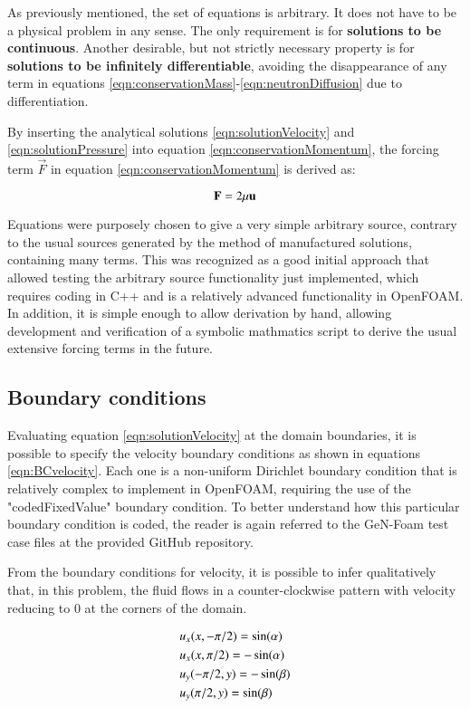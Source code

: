 As previously mentioned, the set of equations is arbitrary.
It does not have to be a physical problem in any sense.
The only requirement is for \textbf{solutions to be continuous}.
Another desirable, but not strictly necessary property is for \textbf{solutions to be infinitely differentiable}, avoiding the disappearance of any term in equations \ref{eqn:conservationMass}-\ref{eqn:neutronDiffusion} due to differentiation.

By inserting the analytical solutions \ref{eqn:solutionVelocity} and \ref{eqn:solutionPressure} into equation \ref{eqn:conservationMomentum}, the forcing term $ \vec{F} $ in equation \ref{eqn:conservationMomentum} is derived as:

\begin{equation}
    \momentumForcingTerms
\end{equation}

Equations were purposely chosen to give a very simple arbitrary source, contrary to the usual sources generated by the method of manufactured solutions, containing many terms.
This was recognized as a good initial approach that allowed testing the arbitrary source functionality just implemented, which requires coding in C++ and is a relatively advanced functionality in OpenFOAM.
In addition, it is simple enough to allow derivation by hand, allowing development and verification of a symbolic mathmatics script to derive the usual extensive forcing terms in the future.

\subsection{Boundary conditions}

Evaluating equation \ref{eqn:solutionVelocity} at the domain boundaries, it is possible to specify the velocity boundary conditions as shown in equations \ref{eqn:BCvelocity}.
Each one is a non-uniform Dirichlet boundary condition that is relatively complex to implement in OpenFOAM, requiring the use of the "codedFixedValue" boundary condition.
To better understand how this particular boundary condition is coded, the reader is again referred to the GeN-Foam test case files at the provided GitHub repository.

From the boundary conditions for velocity, it is possible to infer qualitatively that, in this problem, the fluid flows in a counter-clockwise pattern with velocity reducing to 0 at the corners of the domain.

\begin{equation}
    \BCvelocity
\end{equation}

